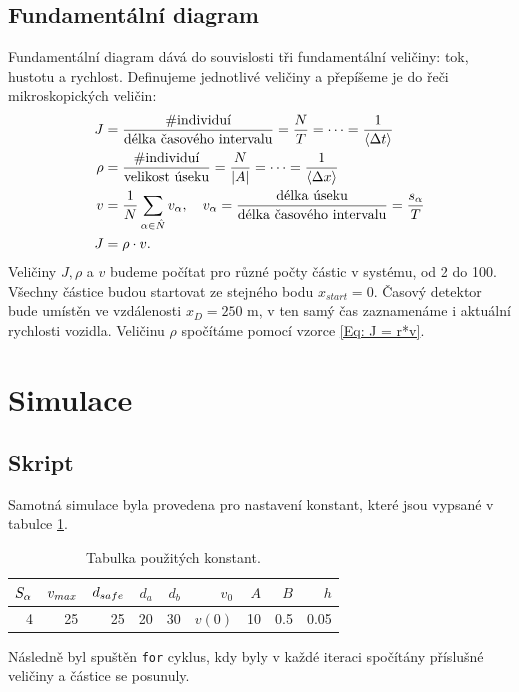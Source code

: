 \documentclass[a4paper, 12pt, fleqn]{article}
\begin{document}
\subsection{Fundamentální diagram}
Fundamentální diagram dává do souvislosti tři fundamentální veličiny: tok, hustotu a rychlost. Definujeme jednotlivé veličiny a přepíšeme je do řeči mikroskopických veličin:
\begin{align}
	J & = \frac{\# \text{individuí}}{\text{délka časového intervalu}} = \frac{N}{T} = \cdots = \frac{1}{\langle \Delta t \rangle} \nonumber \\
	\rho & = \frac{\# \text{individuí}}{\text{velikost úseku}} = \frac{N}{|A|} = \cdots = \frac{1}{\langle \Delta x \rangle} \nonumber \\
	v & = \frac{1}{N} \sum_{\alpha \in \hat{N}} v_{\alpha}, \quad v_{\alpha} = \frac{\text{délka úseku}}{\text{délka časového intervalu}} = \frac{s_{\alpha}}{T} \nonumber \\
	J & = \rho \cdot v. \label{Eq: J = r*v}
\end{align}
Veličiny $J, \rho$ a $v$ budeme počítat pro různé počty částic v systému, od 2 do 100. Všechny částice budou startovat ze stejného bodu $x_{start} = 0$. Časový detektor bude umístěn ve vzdálenosti $x_D = 250$ m, v ten samý čas zaznamenáme i aktuální rychlosti vozidla. Veličinu $\rho$ spočítáme pomocí vzorce \eqref{Eq: J = r*v}.

\section{Simulace}

\subsection{Skript}
Samotná simulace byla provedena pro nastavení konstant, které jsou vypsané v tabulce \ref{Tab: Konstanty}.

\begin{table}
	\centering
	\begin{tabular}{rrrrrrrrr}
		\toprule
		$S_{\alpha}$ & $v_{max}$ & $d_{safe}$ & $d_a$ & $d_b$ & $v_0$ & $A$ & $B$ & $h$ \\ \midrule
		4 & 25 & 25 & 20 & 30 & $v(0)$ & 10 & 0.5 & 0.05 \\ \bottomrule
	\end{tabular}
	\caption{Tabulka použitých konstant.}
	\label{Tab: Konstanty}
\end{table}

Následně byl spuštěn \verb|for| cyklus, kdy byly v každé iteraci spočítány příslušné veličiny a částice se posunuly.
\end{document}
